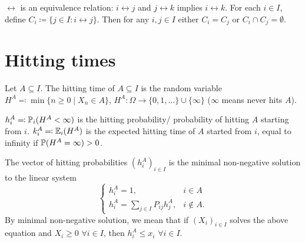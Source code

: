 \documentclass[10pt, a4paper]{article}
\begin{document}
$\leftrightarrow$ is an equivalence relation:
$i \leftrightarrow j$ and $j \leftrightarrow k$ implies $i \leftrightarrow k$.
For each $i \in I$,
define $C_i \coloneqq \{j \in I : i \leftrightarrow j\}$.
Then for any $i, j \in I$ either $C_i = C_j$ or $C_i \cap C_j = \emptyset$.

\newpage

\section{Hitting times}

Let $A \subseteq I$.
The hitting time of $A \subseteq I$ is the random variable $H ^ A \eqqcolon \min\{n \geq 0 \mid X_n \in A\}$,
$H ^ A : \Omega \to \{0, 1, \dotsc\} \cup \{\infty\}$
($\infty$ means never hits $A$).

\begin{definition}
    $h_{i}^{A} \eqqcolon \P_i(H ^ A < \infty)$ is the hitting probability/
    probability of hitting $A$ starting from $i$.
    $k_{i}^{A} \eqqcolon \E_{i}(H ^ A)$ is the expected hitting time of $A$ started from $i$,
    equal to infinity if $\P(H ^ A = \infty) > 0$.
\end{definition}

\begin{theorem}
    The vector of hitting probabilities $(h_{i}^{A})_{i \in I}$ is the minimal non-negative solution to the linear system
    \[
    \begin{cases}
        h_{i}^{A} = 1, & i \in A \\
        h_{i}^{A} = \sum_{j \in I}P_{ij}h_{j}^{A}, & i \notin A.
    \end{cases}
    \]
    By minimal non-negative solution,
    we mean that if $(X_i)_{i \in I}$ solves the above equation and $X_i \geq 0$ $\forall i \in I$,
    then $h_{i}^{A} \leq x_i$ $\forall i \in I$.
\end{theorem}
\end{document}
